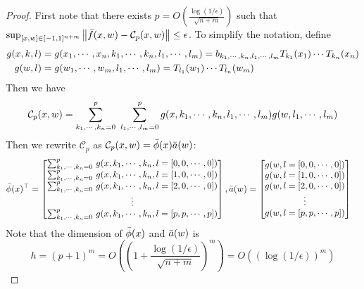 \begin{proof}
First note that there exists $p=O\left(\frac{\log(1/\epsilon)}{\sqrt{n+m}}\right)$ such that $\sup_{[ x, w]\in[-1,1]^{n+m}}\left\|\bar{f}( x, w)-\mathcal{C}_p( x, w)\right\|\leq\epsilon$. To simplify the notation, define
$$\begin{aligned}
g( x, k, l) &= g(x_1,\cdots,x_n,k_1,\cdots,k_n,l_1,\cdots,l_m)=b_{k_1,\cdots,k_n,l_1,\cdots,l_m}T_{k_1}(x_1)\cdots T_{k_n}(x_n) \\
g( w, l) &= g(w_1,\cdots,w_m,l_1,\cdots,l_m) = T_{l_1}(w_1)\cdots T_{l_n}(w_m)
\end{aligned}$$
Then we have
$$\mathcal{C}_p( x, w) = \sum_{k_1,\cdots,k_n=0}^p\,\,\sum_{l_1,\cdots,l_m=0}^p g( x,k_1,\cdots,k_n,l_1,\cdots,l_m)g( w,l_1,\cdots,l_m)$$
Then we rewrite $\mathcal{C}_p$ as $\mathcal{C}_p( x, w)=\bar{\phi}( x)\bar{ a}( w)$:
\begin{equation*}
\begin{aligned}
\bar{\phi}( x)^\top &= \begin{bmatrix}
\sum_{k_1,\cdots,k_n=0}^p\, g( x,k_1,\cdots,k_n, l=[0,0,\cdots,0]) \\
\sum_{k_1,\cdots,k_n=0}^p\, g( x,k_1,\cdots,k_n, l=[1,0,\cdots,0]) \\
\sum_{k_1,\cdots,k_n=0}^p\, g( x,k_1,\cdots,k_n, l=[2,0,\cdots,0]) \\
\vdots \\
\sum_{k_1,\cdots,k_n=0}^p\, g( x,k_1,\cdots,k_n, l=[p,p,\cdots,p])
\end{bmatrix},
\bar{a}(w) = \begin{bmatrix}
g( w, l=[0,0,\cdots,0]) \\
g( w, l=[1,0,\cdots,0]) \\
g( w, l=[2,0,\cdots,0]) \\
\vdots \\
g( w, l=[p,p,\cdots,p])
\end{bmatrix}
\end{aligned}
\end{equation*}
Note that the dimension of $\bar{\phi}( x)$ and $\bar{ a}( w)$ is
$$h=(p+1)^{m}=O\left(\left(1+\frac{\log(1/\epsilon)}{\sqrt{n+m}}\right)^m\right)=O\left((\log(1/\epsilon))^m\right)$$
\end{proof}

